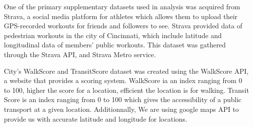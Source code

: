 \documentclass{llncs}
\begin{document}
One of the primary supplementary datasets used in analysis was acquired from Strava, a social media platform for athletes which allows them to upload their GPS-recorded workouts for friends and followers to see. Strava provided data of pedestrian workouts in the city of Cincinnati, which include latitude and longitudinal data of members' public workouts. This dataset was gathered through the Strava API, and Strava Metro service.

City's WalkScore and TransitScore dataset was created using the WalkScore API, a website that provides a scoring system. WalkScore ia an index ranging from 0 to 100, higher the score for a location, efficient the  location is for walking. Transit Score is an index ranging from 0 to 100 which gives the accessibility of a public transport at a given location. Additionnally, We are using google maps API to provide us with accurate latitude and longitude for locations.
\end{document}
